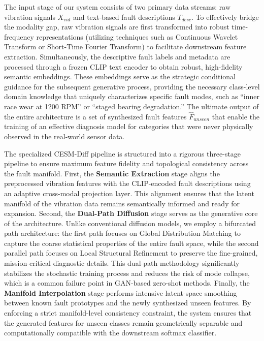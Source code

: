 \documentclass[journal,12pt,onecolumn]{IEEEtran}
\begin{document}
The input stage of our system consists of two primary data streams: raw vibration signals $X_{vid}$ and text-based fault descriptions $T_{desc}$. To effectively bridge the modality gap, raw vibration signals are first transformed into robust time-frequency representations (utilizing techniques such as Continuous Wavelet Transform or Short-Time Fourier Transform) to facilitate downstream feature extraction. Simultaneously, the descriptive fault labels and metadata are processed through a frozen CLIP text encoder to obtain robust, high-fidelity semantic embeddings. These embeddings serve as the strategic conditional guidance for the subsequent generative process, providing the necessary class-level domain knowledge that uniquely characterizes specific fault modes, such as ``inner race wear at 1200 RPM'' or ``staged bearing degradation.'' The ultimate output of the entire architecture is a set of synthesized fault features $\hat{F}_{unseen}$ that enable the training of an effective diagnosis model for categories that were never physically observed in the real-world sensor data.

The specialized CESM-Diff pipeline is structured into a rigorous three-stage pipeline to ensure maximum feature fidelity and topological consistency across the fault manifold. First, the \textbf{Semantic Extraction} stage aligns the preprocessed vibration features with the CLIP-encoded fault descriptions using an adaptive cross-modal projection layer. This alignment ensures that the latent manifold of the vibration data remains semantically informed and ready for expansion. Second, the \textbf{Dual-Path Diffusion} stage serves as the generative core of the architecture. Unlike conventional diffusion models, we employ a bifurcated path architecture: the first path focuses on Global Distribution Matching to capture the coarse statistical properties of the entire fault space, while the second parallel path focuses on Local Structural Refinement to preserve the fine-grained, mission-critical diagnostic details. This dual-path methodology significantly stabilizes the stochastic training process and reduces the risk of mode collapse, which is a common failure point in GAN-based zero-shot methods. Finally, the \textbf{Manifold Interpolation} stage performs intensive latent-space smoothing between known fault prototypes and the newly synthesized unseen features. By enforcing a strict manifold-level consistency constraint, the system ensures that the generated features for unseen classes remain geometrically separable and computationally compatible with the downstream softmax classifier.
\end{document}
